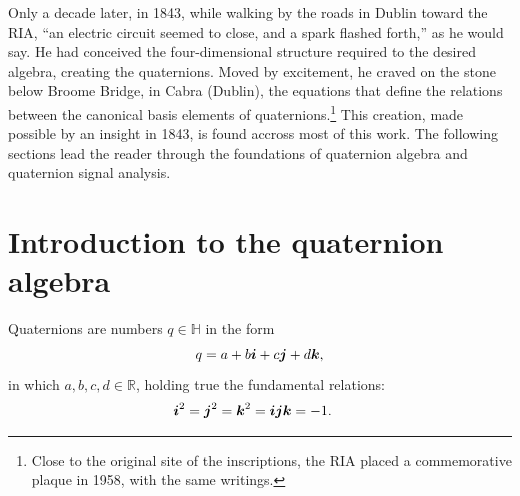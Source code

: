 Only a decade later, in 1843, while walking by the roads in Dublin toward the RIA, ``an electric circuit seemed to close, and a spark flashed forth,'' as he would say. He had conceived the four-dimensional structure required to the desired algebra, creating the quaternions. Moved by excitement, he craved on the stone below Broome Bridge, in Cabra (Dublin), the equations that define the relations between the canonical basis elements of quaternions.\footnote{Close to the original site of the inscriptions, the RIA placed a commemorative plaque in 1958, with the same writings.} This creation, made possible by an insight in 1843, is found accross most of this work. The following sections lead the reader through the foundations of quaternion algebra and quaternion signal analysis.


\section{Introduction to the quaternion algebra}

Quaternions are numbers $q \in \mathbb{H}$ in the form
\begin{equation}
    q = a + b\boldsymbol{i} + c\boldsymbol{j} + d\boldsymbol{k},
    \label{eq:q}
\end{equation}
in which $a, b, c, d \in \mathbb{R}$, holding true the fundamental relations:
\begin{equation}
    \label{eq:fund_rel}
    \begin{aligned}
        \boldsymbol{i} ^2 = \boldsymbol{j}^2 & =\boldsymbol{k}^2 = \boldsymbol{i} \boldsymbol{j} \boldsymbol{k} = -1.
    \end{aligned}
\end{equation}

